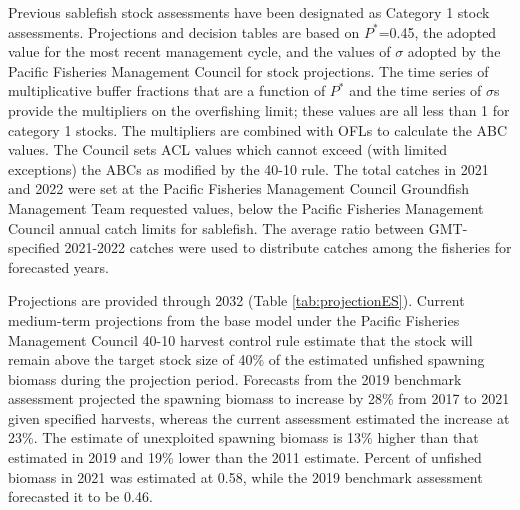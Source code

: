 \documentclass[11pt,
  english,
  a4paper,
]{article}
\begin{document}
Previous sablefish stock assessments have been designated as Category 1 stock assessments. Projections and decision tables are based on $P^*$=0.45, the adopted value for the most recent management cycle, and the values of $\sigma$ adopted by the Pacific Fisheries Management Council for stock projections. The time series of multiplicative buffer fractions that are a function of $P^*$ and the time series of $\sigma$s provide the multipliers on the overfishing limit; these values are all less than 1 for category 1 stocks. The multipliers are combined with OFLs to calculate the ABC values. The Council sets ACL values which cannot exceed (with limited exceptions) the ABCs as modified by the 40-10 rule. The total catches in 2021 and 2022 were set at the Pacific Fisheries Management Council Groundfish Management Team requested values, below the Pacific Fisheries Management Council annual catch limits for sablefish. The average ratio between GMT-specified 2021-2022 catches were used to distribute catches among the fisheries for forecasted years.

Projections are provided through 2032 (Table \ref{tab:projectionES}). Current medium-term projections from the base model under the Pacific Fisheries Management Council 40-10 harvest control rule estimate that the stock will remain above the target stock size of 40\% of the estimated unfished spawning biomass during the projection period.  Forecasts from the 2019 benchmark assessment projected the spawning biomass to increase by 28\% from 2017 to 2021 given specified harvests, whereas the current assessment estimated the increase at 23\%. The estimate of unexploited spawning biomass is 13\% higher than that estimated in 2019 and 19\% lower than the 2011 estimate. Percent of unfished biomass in 2021 was estimated at 0.58, while the 2019 benchmark assessment forecasted it to be  0.46.

\begingroup\fontsize{10}{12}\selectfont
\begingroup\fontsize{10}{12}\selectfont
\end{document}
